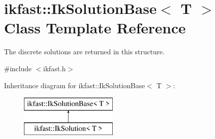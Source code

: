 \hypertarget{classikfast_1_1IkSolutionBase}{\section{ikfast\-:\-:Ik\-Solution\-Base$<$ T $>$ Class Template Reference}
\label{classikfast_1_1IkSolutionBase}
}


The discrete solutions are returned in this structure.  




{\ttfamily \#include $<$ikfast.\-h$>$}

Inheritance diagram for ikfast\-:\-:Ik\-Solution\-Base$<$ T $>$\-:\begin{figure}[H]
\begin{center}
\leavevmode
\includegraphics[height=2.000000cm]{classikfast_1_1IkSolutionBase}
\end{center}
\end{figure}
